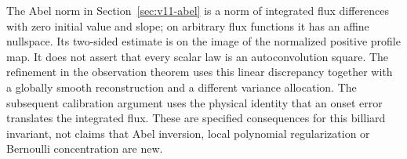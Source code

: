 The Abel norm in Section~\ref{sec:v11-abel} is a norm of integrated
flux differences with zero initial value and slope; on arbitrary flux
functions it has an affine nullspace. Its two-sided estimate is on the
image of the normalized positive profile map. It does not assert that
every scalar law is an autoconvolution square. The refinement in the
observation theorem uses this linear discrepancy together with a
globally smooth reconstruction and a different variance allocation.
The subsequent calibration argument uses the physical identity that an
onset error translates the integrated flux. These are specified
consequences for this billiard invariant, not claims that Abel inversion,
local polynomial regularization or Bernoulli concentration are new.

